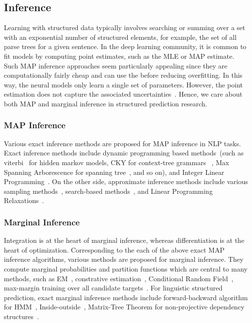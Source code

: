 \subsection{Inference}
\label{ssec:bg:inference}

Learning with structured data typically involves searching or summing
over a set with an exponential number of structured elements, for
example, the set of all parse trees for a given sentence. In the deep
learning community, it is common to fit models by computing point
estimates, such as the MLE or MAP estimate. Such MAP inference
approaches seem particularly appealing since they are computationally
fairly cheap and can use the before reducing overfitting. In this
way, the neural models only learn a single set of parameters. However,
the point estimation does not capture the associated
uncertainties~\citep{murphy2022probabilistic,wilson2020bayesian}.
Hence, we care about both MAP
and marginal inference in structured prediction research.

\subsubsection{MAP Inference}
\label{sssec:bg:map-inference}
Various exact inference methods are proposed
for MAP inference in NLP tasks. Exact inference methods include
dynamic programming based methods~(such as
viterbi~\citep{viterbi1967error} for hidden markov models, CKY for
context-tree
grammars~\citep{kasami1966efficient,younger1967recognition,cocke1969programming}
, Max Spanning Arborescence for spanning
tree~\citep{chu1965shortest,edmonds1967optimum}, and so on), and
Integer Linear
Programming~\citep{roth2005integer,roth2007global,berant2014modeling}. On the other side, approximate inference methods include various
sampling methods~\citep{finkel2005incorporating,singh2012monte},
search-based
methods~\citep{daume2009search,ross2011reduction,chang2015learning},
and Linear Programming
Relaxations~\citep{rush2012tutorial,werner2014power}.

\subsubsection{Marginal Inference}
\label{sssec:bg:marginal-inference}
Integration is at the heart of marginal inference, whereas
differentiation is at the heart of optimization. Corresponding to the
each of the above exact MAP inference algorithms, various methods are
proposed for marginal inference. They compute marginal probabilities
and partition functions which are central to many methods, such as
EM~\citep{baker1979trainable,weizenbaum1966eliza}, constrative
estimation~\citep{smith2005contrastive}, Conditional Random
Field~\citep[CRF,][]{lafferty01crf}, max-margin training over all
candidate targets~\citep{koller2004max}. For linguistic structured
prediction, exact marginal inference methods include forward-backward
algorithm for HMM~\citep{binder1997space},
Inside-outside~\citep{baker1979trainable}, Matrix-Tree Theorem for
non-projective dependency
structures~\citep{koo-etal-2007-structured,liu2018learning}.

